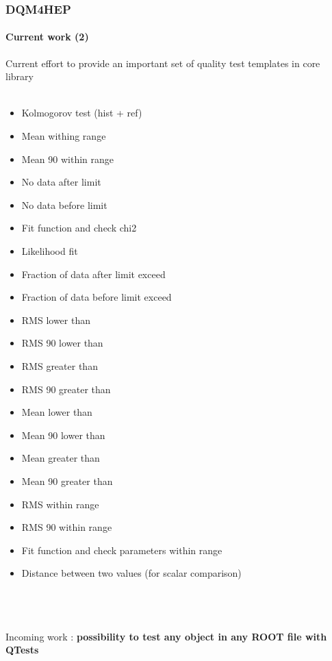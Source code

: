 \documentclass[presentation, 10pt]{beamer}
\begin{document}
\begin{frame}
  \frametitle{DQM4HEP}
  \framesubtitle{Current work (2)}
  \scriptsize
  Current effort to provide an important set of quality test templates in core library \\
  ~\\
  \begin{minipage}{0.49\linewidth}
    \begin{itemize}
      \item Kolmogorov test (hist + ref)
      \item Mean withing range
      \item Mean 90 within range
      \item No data after limit
      \item No data before limit
      \item Fit function and check chi2
      \item Likelihood fit
      \item Fraction of data after limit exceed
      \item Fraction of data before limit exceed
      \item RMS lower than
      \item RMS 90 lower than
    \end{itemize}
  \end{minipage}
  \begin{minipage}{0.49\linewidth}
    \begin{itemize}
      \item RMS greater than
      \item RMS 90 greater than
      \item Mean lower than
      \item Mean 90 lower than
      \item Mean greater than
      \item Mean 90 greater than
      \item RMS within range
      \item RMS 90 within range
      \item Fit function and check parameters within range
      \item Distance between two values (for scalar comparison)
    \end{itemize}
  \end{minipage} \\
  ~\\
  ~\\
  Incoming work : \textbf{possibility to test any object in any ROOT file with QTests}
\end{frame}
\end{document}
